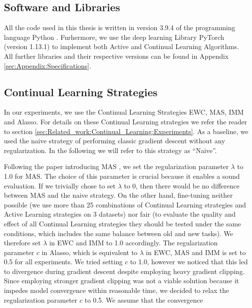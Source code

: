\subsection{Software and Libraries}
\label{sec:ExperimentSetup:Software}
All the code used in this thesis is written in version 3.9.4 of the programming language Python \cite{Rossum1995Python}. Furhermore, we use the deep
learning Library PyTorch \cite{paszke2019pytorch} (version 1.13.1) to implement both Active and Continual Learning Algorithms. All further libraries
and their respective versions can be found in Appendix \ref{sec:Appendix:Specifications}.

\subsection{Continual Learning Strategies}
\label{sec:ExperimentSetup:CLStrategies}
In our experiments, we use the Continual Learning Strategies EWC, MAS, IMM and Alasso. For details on these Continual Learning strategies we refer
the reader to section \ref{sec:Related_work:Continual_Learning:Experiments}. As a baseline, we used the naive strategy of performing classic
gradient descent without any regularization. In the following we will refer to this strategy as \enquote{Naive}. \par
Following the paper introducing MAS \cite{aljundi2018memory}, we set the regularization parameter $\lambda$ to 1.0 for MAS. The choice of this parameter
is crucial because it enables a sound evaluation. If we trivially chose to set $\lambda$ to 0, then there would be no difference between MAS and the naive
strategy. On the other hand, fine-tuning neither possible (we use more than 25 combinations of Continual Learning strategies and Active Learning strategies 
on 3 datasets) nor fair (to evaluate the quality and effect of all Continual Learning strategies they should be tested under the same conditions, which
includes the same balance between old and new tasks). We therefore set $\lambda$ in EWC and IMM to 1.0 accordingly. The regularization parameter $c$ in
Alasso, which is equivalent to $\lambda$ in EWC, MAS and IMM is set to 0.5 for all experiments. We tried setting $c$ to 1.0, however we noticed that this
led to divergence during gradient descent despite employing heavy gradient clipping. Since employing stronger gradient clipping was not a viable solution
because it impedes model convergence within reasonable time, we decided to relax the regularization parameter $c$ to 0.5. We assume that the convergence 
